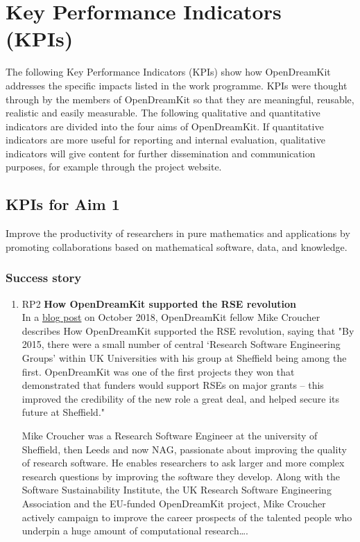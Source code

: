 \section{Key Performance Indicators (KPIs)}
\label{section.kpi}

The following Key Performance Indicators (KPIs) show how OpenDreamKit addresses the specific impacts listed in the work
programme. KPIs were thought through by the members of OpenDreamKit so that they are meaningful, reusable, realistic and easily measurable.
The following qualitative and quantitative indicators are divided into the four aims of OpenDreamKit. If quantitative indicators are more
useful for reporting and internal evaluation, qualitative indicators will give content for further dissemination and communication purposes,
for example through the project website.


\subsection{KPIs for Aim 1}

\begin{aim}
  Improve the productivity of researchers in pure mathematics and
  applications by promoting collaborations based on mathematical
  software, data, and knowledge.
\end{aim}

\subsubsection{Success story}

\begin{enumerate}
\item RP2 \textbf{How OpenDreamKit supported the RSE revolution}\\
  In a \href{https://opendreamkit.org/2018/10/29/ODK-RSE/}{blog post}
  on October 2018, OpenDreamKit fellow Mike Croucher describes How
  OpenDreamKit supported the RSE revolution, saying that "By 2015,
  there were a small number of central ‘Research Software Engineering
  Groups’ within UK Universities with his group at Sheffield being
  among the first. OpenDreamKit was one of the first projects they won
  that demonstrated that funders would support RSEs on major grants –
  this improved the credibility of the new role a great deal, and helped
  secure its future at Sheffield."

  \noindent
  Mike Croucher was a Research Software Engineer at the university
  of Sheffield, then Leeds and now NAG, passionate about improving the quality of research
  software. He enables researchers to ask larger and more complex
  research questions by improving the software they develop. Along
  with the Software Sustainability Institute, the UK Research Software
  Engineering Association and the EU-funded OpenDreamKit project,
  Mike Croucher actively campaign to improve the career prospects
  of the talented people who underpin a huge amount of computational
  research….
\end{enumerate}

